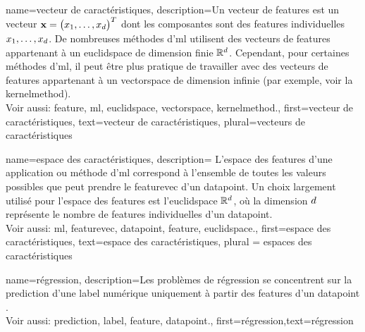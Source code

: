 {name={vecteur de caractéristiques},
	description={Un  vecteur de \glspl{feature} est un vecteur 
		${\bf x} = \big(x_{1},\ldots,x_{d}\big)^{T}$ dont les composantes sont des \glspl{feature} individuelles 
		$x_{1},\ldots,x_{d}$. De nombreuses méthodes d'\gls{ml} utilisent des vecteurs de \glspl{feature} 
		appartenant à un \gls{euclidspace} de dimension finie $\mathbb{R}^{d}$. 
		Cependant, pour certaines méthodes d'\gls{ml}, il peut être plus pratique de travailler avec des 
		vecteurs de \glspl{feature} appartenant à un \gls{vectorspace} de dimension infinie 
		(par exemple, voir la \gls{kernelmethod}). 
		\\
		Voir aussi: \gls{feature}, \gls{ml}, \gls{euclidspace}, \gls{vectorspace}, \gls{kernelmethod}.},
	first={vecteur de caractéristiques},
	text={vecteur de caractéristiques},
	plural={vecteurs de caractéristiques}
}

{name={espace des caractéristiques},
	description={
		L’espace des \glspl{feature} d’une application ou méthode d'\gls{ml} 
		correspond à l’ensemble de toutes les valeurs possibles que peut prendre le \gls{featurevec} 
		d’un \gls{datapoint}. Un choix largement utilisé pour l’espace des \glspl{feature} est l’\gls{euclidspace} 
		$\mathbb{R}^{d}$, où la dimension $d$ représente le nombre de \glspl{feature} individuelles 
		d’un \gls{datapoint}.
		\\
		Voir aussi: \gls{ml}, \gls{featurevec}, \gls{datapoint}, \gls{feature}, \gls{euclidspace}.},
	first={espace des caractéristiques},
	text={espace des caractéristiques}, plural = {espaces des caractéristiques}
}

{name={régression},
	description={Les problèmes de régression se concentrent sur la \gls{prediction} d'une \gls{label} numérique uniquement à partir des \glspl{feature} d'un \gls{datapoint} \cite[Ch. 2]{MLBasics}.
		\\ 
		Voir aussi: \gls{prediction}, \gls{label}, \gls{feature}, \gls{datapoint}.},
	first={régression},text={régression} 
}


